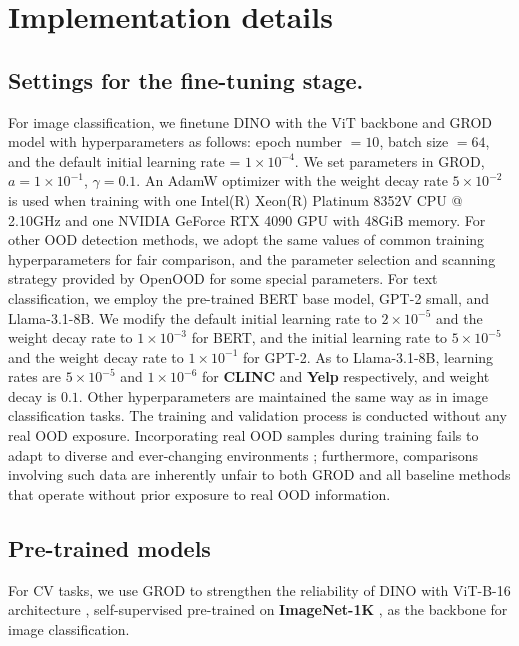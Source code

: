 \documentclass{article}
\theoremstyle{plain}
\theoremstyle{definition}
\theoremstyle{remark}
\begin{document}
\section{Implementation details}
\label{appendix settings}

\subsection{Settings for the fine-tuning stage.}\label{appendix training}
For image classification, we finetune DINO with the ViT backbone and \textsc{GROD} model with hyperparameters as follows: epoch number $= 10$, batch size $= 64$, and the default initial learning rate = $1\times 10^{-4}$. We set parameters in \textsc{GROD}, $a=1\times 10^{-1}$, $\gamma=0.1$. An AdamW \citep{kingma2014adam, loshchilov2017decoupled} optimizer with the weight decay rate $5\times 10^{-2}$ is used when training with one Intel(R) Xeon(R) Platinum 8352V CPU @ 2.10GHz and one NVIDIA GeForce RTX 4090 GPU with 48GiB memory. For other OOD detection methods, we adopt the same values of common training hyperparameters for fair comparison, and the parameter selection and scanning strategy provided by OpenOOD \citep{zhang2023openood, yang2022openood, yang2022fsood, yang2021generalized, bitterwolf2023or} for some special parameters.
%
For text classification, we employ the pre-trained BERT base model, GPT-2 small, and Llama-3.1-8B. We modify the default initial learning rate to $2\times 10^{-5}$ and the weight decay rate to $1 \times 10^{-3}$ for BERT, and the initial learning rate to $5\times 10^{-5}$ and the weight decay rate to $1 \times 10^{-1}$ for GPT-2. As to Llama-3.1-8B, learning rates are $5\times 10^{-5}$ and $1\times 10^{-6}$ for \textbf{CLINC} and \textbf{Yelp} respectively, and weight decay is $0.1$. Other hyperparameters are maintained the same way as in image classification tasks.
The training and validation process is conducted without any real OOD exposure. Incorporating real OOD samples during training fails to adapt to diverse and ever-changing environments \citep{hendrycks2018deep}; furthermore, comparisons involving such data are inherently unfair to both \textsc{GROD} and all baseline methods that operate without prior exposure to real OOD information.

\subsection{Pre-trained models}
For CV tasks, we use \textsc{GROD} to strengthen the reliability of DINO \citep{caron2021emerging} with ViT-B-16 architecture \citep{dosovitskiy2020image}, self-supervised pre-trained on \textbf{ImageNet-1K} \citep{imagenet15russakovsky}, as the backbone for image classification.
\end{document}
